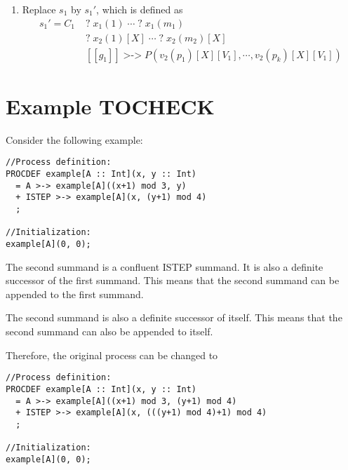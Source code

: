 \begin{enumerate}
\item Replace $s_1$ by ${s_1}'$, which is defined as
\begin{align*}
{s_1}' = C_1 \; &\texttt{?} \; x_1(1) \; \cdots{} \; \texttt{?} \; x_1(m_1) \\
&\texttt{?} \; x_2(1)[X] \; \cdots{} \; \texttt{?} \; x_2(m_2)[X] \\
&[[g_1]] \; \texttt{>->} \; P(v_2(p_1)[X][V_1], \cdots{}, v_2(p_k)[X][V_1])
\end{align*}

\end{enumerate}

\clearpage
\section{Example TOCHECK}

Consider the following example:

\begin{lstlisting}
//Process definition:
PROCDEF example[A :: Int](x, y :: Int)
  = A >-> example[A]((x+1) mod 3, y)
  + ISTEP >-> example[A](x, (y+1) mod 4)
  ;

//Initialization:
example[A](0, 0);
\end{lstlisting}

The second summand is a confluent ISTEP summand.
It is also a definite successor of the first summand.
This means that the second summand can be appended to the first summand.

The second summand is also a definite successor of itself.
This means that the second summand can also be appended to itself.

Therefore, the original process can be changed to

\begin{lstlisting}
//Process definition:
PROCDEF example[A :: Int](x, y :: Int)
  = A >-> example[A]((x+1) mod 3, (y+1) mod 4)
  + ISTEP >-> example[A](x, (((y+1) mod 4)+1) mod 4)
  ;

//Initialization:
example[A](0, 0);
\end{lstlisting}


